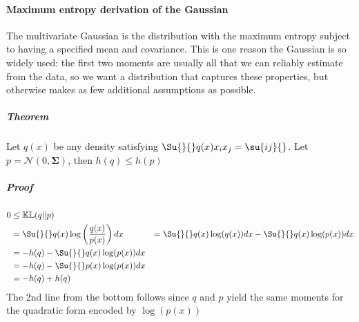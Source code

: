 \paragraph{Maximum entropy derivation of the Gaussian}
The multivariate Gaussian is the distribution with the maximum entropy subject to having
a specified mean and covariance. This is one reason the Gaussian is so widely used: the
first two moments are usually all that we can reliably estimate from the data, so we want
a distribution that captures these properties, but otherwise makes as few additional 
assumptions as possible.\\

\subparagraph{Theorem}
Let $q(x)$ be any density satisfying $\Su{}{}q(x)x_{i}x_{j} = \su{ij}{}$. Let 
$p = \mathcal{N}(0, \bm{\Sigma})$, then $h(q)\leq h(p)$

\subparagraph{Proof}
\begin{align*}
    0 &\leq \mathbb{KL}(q||p)\\
      &= \Su{}{}q(x)\log\left(\frac{q(x)}{p(x)}\right)dx
      &= \Su{}{}q(x)\log(q(x))dx - \Su{}{}q(x)\log(p(x))dx\\
      &= -h(q) - \Su{}{}q(x)\log(p(x))dx\\
      &= -h(q) - \Su{}{}p(x)\log(p(x))dx\\
      &= -h(q) + h(q)
\end{align*}
The 2nd line from the bottom follows since $q$ and $p$ yield the same moments for the 
quadratic form encoded by $\log(p(x))$






